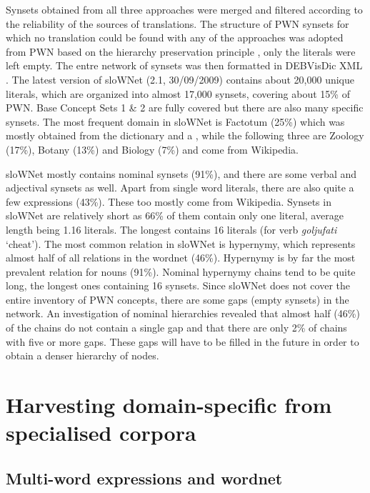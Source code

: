 \documentclass[output=paper]{LSP/langsci}
\begin{document}
Synsets obtained from all three approaches were merged and filtered according to the reliability of the sources of translations. The structure of PWN synsets for which no translation could be found with any of the approaches was adopted from PWN based on the hierarchy preservation principle \citep{Tufis2000}, only the literals were left empty. The entre network of synsets was then formatted in DEBVisDic XML \citep{HorakEtAl2005}. The latest version of sloWNet (2.1, 30/09/2009) contains about 20,000 unique literals, which are organized into almost 17,000 synsets, covering about 15\% of PWN. Base Concept Sets 1 \& 2 are fully covered but there are also many specific synsets. The most frequent domain in sloWNet is Factotum (25\%) which was mostly obtained from the dictionary and a , while the following three are Zoology (17\%), Botany (13\%) and Biology (7\%) and come from Wikipedia.

sloWNet mostly contains nominal synsets (91\%), and there are some verbal and adjectival synsets as well. Apart from single word literals, there are also quite a few  expressions (43\%). These too mostly come from Wikipedia. Synsets in sloWNet are relatively short as 66\% of them contain only one literal, average  length being 1.16 literals. The longest  contains 16 literals (for verb \textit{goljufati} `cheat'). The most common relation in sloWNet is hypernymy, which represents almost half of all relations in the wordnet (46\%). Hypernymy is by far the most prevalent relation for nouns (91\%). Nominal hypernymy chains tend to be quite long, the longest ones containing 16 synsets. Since sloWNet does not cover the entire inventory of PWN concepts, there are some gaps (empty synsets) in the network. An investigation of nominal hierarchies revealed that almost half (46\%) of the chains do not contain a single gap and that there are only 2\% of chains with five or more gaps. These gaps will have to be filled in the future in order to obtain a denser hierarchy of nodes.

\section{Harvesting domain-specific  from specialised corpora}\label{sec:vintar:3}
\subsection{Multi-word expressions and wordnet}\label{sec:3.1}
\end{document}
